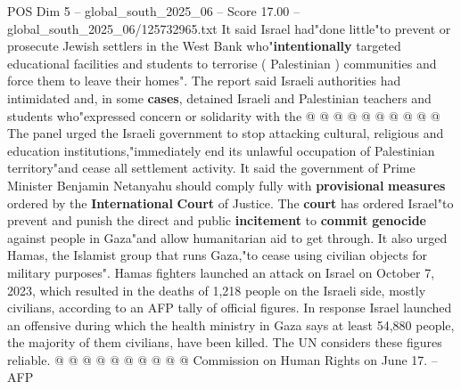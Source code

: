 \begin{textsample}{POS Dim 5 – global\_south\_2025\_06 – Score 17.00 – global\_south\_2025\_06/125732965.txt}
It said Israel had"done little"to prevent or prosecute Jewish settlers in the West Bank who"\textbf{intentionally} targeted educational facilities and students to terrorise ( Palestinian ) communities and force them to leave their homes".
The report said Israeli authorities had intimidated and, in some \textbf{cases}, detained Israeli and Palestinian teachers and students who"expressed concern or solidarity with the @ @ @ @ @ @ @ @ @ @ The panel urged the Israeli government to stop attacking cultural, religious and education institutions,"immediately end its unlawful occupation of Palestinian territory"and cease all settlement activity.
It said the government of Prime Minister Benjamin Netanyahu should comply fully with \textbf{provisional} \textbf{measures} ordered by the \textbf{International} \textbf{Court} of Justice.
The \textbf{court} has ordered Israel"to prevent and punish the direct and public \textbf{incitement} to \textbf{commit} \textbf{genocide} against people in Gaza"and allow humanitarian aid to get through.
It also urged Hamas, the Islamist group that runs Gaza,"to cease using civilian objects for military purposes".
Hamas fighters launched an attack on Israel on October 7, 2023, which resulted in the deaths of 1,218 people on the Israeli side, mostly civilians, according to an AFP tally of official figures.
In response Israel launched an offensive during which the health ministry in Gaza says at least 54,880 people, the majority of them civilians, have been killed.
The UN considers these figures reliable. @ @ @ @ @ @ @ @ @ @ Commission on Human Rights on June 17. -- AFP

\end{textsample}

